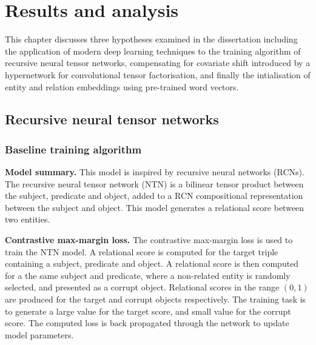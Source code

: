 

\chapter{Results and analysis}  %

\ifpdf
     \graphicspath{{Figs/Chapter4/}}
\else
    \graphicspath{{Chapter4/Figs/Vector/}{Chapter4/Figs/}}
\fi

This chapter discusses three hypotheses examined in the dissertation including the application of modern deep learning techniques to the training algorithm of recursive neural tensor networks, compensating for covariate shift introduced by a hypernetwork for convolutional tensor factorisation, and finally the intialisation of entity and relation embeddings using pre-trained word vectors. 



\section{Recursive neural tensor networks}

\subsection{Baseline training algorithm}
\textbf{Model summary.} This model is inspired by recursive neural networks (RCNs). The recursive neural tensor network (NTN) is a bilinear tensor product between the subject, predicate and object, added to a RCN compositional representation between the subject and object. This model generates a relational score between two entities. 

\noindent \textbf{Contrastive max-margin loss.} The contrastive max-margin loss is used to train the NTN model. A relational score is computed for the target triple containing a subject, predicate and object. A relational score is then computed for a the same subject and predicate, where a non-related entity is randomly selected, and presented as a corrupt object. Relational scores in the range $ (0,1) $ are produced for the target and corrupt objects respectively. The training task is to generate a large value for the target score, and small value for the corrupt score. The computed loss is back propagated through the network to update model parameters. \par

